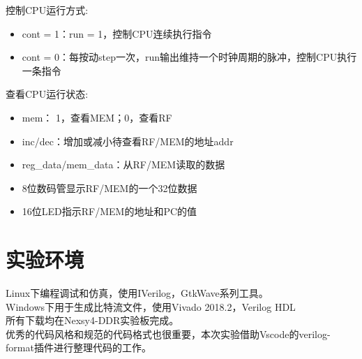 \documentclass[12pt, a4paper]{article}
\begin{document}
控制CPU运行方式:
\begin{itemize}
\item cont = 1：run = 1，控制CPU连续执行指令
\item cont = 0：每按动step一次，run输出维持一个时钟周期的脉冲，控制CPU执行一条指令
\end{itemize}
查看CPU运行状态:
\begin{itemize}
\item mem： 1，查看MEM；0，查看RF
\item inc/dec：增加或减小待查看RF/MEM的地址addr
\item reg\_data/mem\_data：从RF/MEM读取的数据
\item 8位数码管显示RF/MEM的一个32位数据
\item 16位LED指示RF/MEM的地址和PC的值
\end{itemize}

\section{实验环境}
Linux下编程调试和仿真，使用IVerilog，GtkWave系列工具。\\
Windows下用于生成比特流文件，使用Vivado 2018.2，Verilog HDL\\
所有下载均在Nexsy4-DDR实验板完成。\\
优秀的代码风格和规范的代码格式也很重要，本次实验借助Vscode的verilog-format插件进行整理代码的工作。
\end{document}
